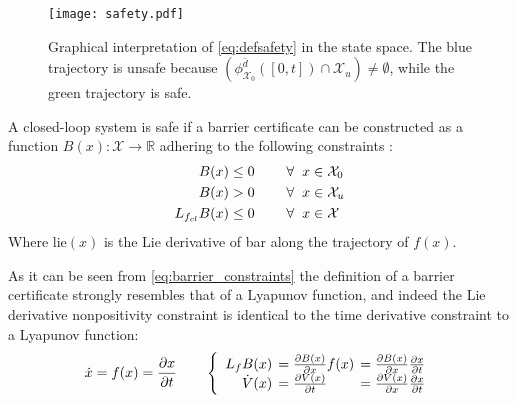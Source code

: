 \begin{figure}[H]
	\center
	\texttt{[image: safety.pdf]}	
	\caption{Graphical interpretation of \autoref{eq:defsafety} in the state space. The blue trajectory is unsafe because $\left( \phi_{\mathcal{X}_0}^{\bar{d}}([0,t]) \cap \mathcal{X}_u \right) \neq \emptyset$, while the green trajectory is safe.}
	\label{fig:defsafety}
\end{figure}
\label{def_safety}

\begin{exa}\label{def:barrier_certificate}	
A closed-loop system is safe if a barrier certificate can be constructed as a function $B(x):\mathcal{X} \rightarrow \mathbb{R}$ adhering to the following constraints \citep{bib:org_control}:
\begin{subequations}\label{eq:barrier_constraints}
\begin{flalign}
B(x) &\leq 0 \hspace{0.8cm}  \forall \hspace{2mm} x \in \mathcal{X}_0  \label{cer1}\\
B(x) &> 0  \hspace{0.8cm}  \forall \hspace{2mm} x \in \mathcal{X}_u \label{cer2} \\
L_{f_{cl}}B(x) &\leq 0 \hspace{0.8cm}  \forall \hspace{2mm} x \in \mathcal{X} \label{cer3}
\end{flalign}
\end{subequations}
Where \gls{lie}$(x)$ is the Lie derivative of \gls{bar} along the trajectory of $f(x)$. 
\end{exa}
As it can be seen from \autoref{eq:barrier_constraints} the definition of a barrier certificate strongly resembles that of a Lyapunov function, and indeed the Lie derivative nonpositivity constraint is identical to the time derivative constraint to a Lyapunov function:
\begin{equation}
\dot{x}  = f(x) = \frac{\partial x}{\partial t} \qquad
\left\{ \begin{array}{r l l}
L_fB(x) \hspace*{-2mm}&= \tfrac{\partial B(x)}{\partial x} f(x) \hspace*{-2mm}&= \tfrac{\partial B(x)}{\partial x} \frac{\partial x}{\partial t}\\
\dot{V}(x) \hspace*{-2mm}&= \tfrac{\partial V(x)}{\partial t} \hspace*{-2mm}&= \tfrac{\partial V(x)}{\partial x}\tfrac{\partial x}{\partial t}
\end{array} \right. \label{eq:dBdt_dVdt}
\end{equation}

